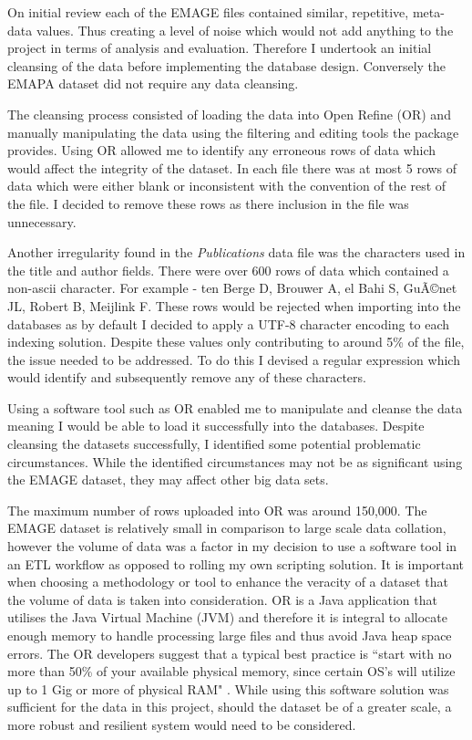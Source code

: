 On initial review each of the EMAGE files contained similar, repetitive, meta-data values. Thus creating a level of noise which would not add anything to the project in terms of analysis and evaluation. Therefore I undertook an initial cleansing of the data before implementing the database design. Conversely the EMAPA dataset did not require any data cleansing.

The cleansing process consisted of loading the data into Open Refine (OR) and manually manipulating the data using the filtering and editing tools the package provides. Using OR allowed me to identify any erroneous rows of data which would affect the integrity of the dataset. In each file there was at most 5 rows of data which were either blank or inconsistent with the convention of the rest of the file. I decided to remove these rows as there inclusion in the file was unnecessary.

Another irregularity found in the \textit{Publications} data file was the characters used in the title and author fields. There were over 600 rows of data which contained a non-ascii character. For example - ten Berge D, Brouwer A, el Bahi S, GuÃ©net JL, Robert B, Meijlink F. These rows would be rejected when importing into the databases as by default I decided to apply a UTF-8 character encoding to each indexing solution. Despite these values only contributing to around 5\% of the file, the issue needed to be addressed. To do this I devised a regular expression which would identify and subsequently remove any of these characters.

Using a software tool such as OR enabled me to manipulate and cleanse the data meaning I would be able to load it successfully into the databases. Despite cleansing the datasets successfully, I identified some potential problematic circumstances. While the identified circumstances may not be as significant using the EMAGE dataset, they may affect other big data sets.

The maximum number of rows uploaded into OR was around 150,000. The EMAGE dataset is relatively small in comparison to large scale data collation, however the volume of data was a factor in my decision to use a software tool in an ETL workflow as opposed to rolling my own scripting solution. It is important when choosing a methodology or tool to enhance the veracity of a dataset that the volume of data is taken into consideration. OR is a Java application that utilises the Java Virtual Machine (JVM) and therefore it is integral to allocate enough memory to handle processing large files and thus avoid Java heap space errors. The OR developers suggest that a typical best practice is ``start with no more than 50\% of your available physical memory, since certain OS's will utilize up to 1 Gig or more of physical RAM" \cite{googref}. While using this software solution was sufficient for the data in this project, should the dataset be of a greater scale, a more robust and resilient system would need to be considered.

